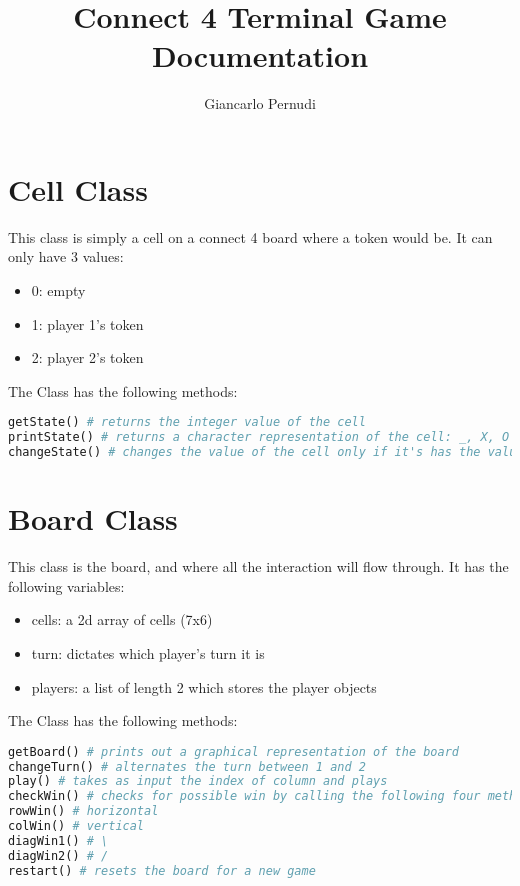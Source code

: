 \documentclass[12pt]{article}
\title{Connect 4 Terminal Game Documentation}
\author{Giancarlo Pernudi}
\begin{document}
\maketitle

\section{Cell Class}

This class is simply a cell on a connect 4 board where a token would be. It can only have 3 values:
\begin{itemize}
  \item 0: empty
  \item 1: player 1's token
  \item 2: player 2's token
\end{itemize}


The Class has the following methods:
\begin{lstlisting}[language=Python]
getState() # returns the integer value of the cell
printState() # returns a character representation of the cell: _, X, O
changeState() # changes the value of the cell only if it's has the value of 0 when called
\end{lstlisting}

\section{Board Class}

This class is the board, and where all the interaction will flow through. It has the following variables:
\begin{itemize}
  \item cells: a 2d array of cells (7x6)
  \item turn: dictates which player's turn it is
  \item players: a list of length 2 which stores the player objects
\end{itemize}


The Class has the following methods:
\begin{lstlisting}[language=Python]
getBoard() # prints out a graphical representation of the board
changeTurn() # alternates the turn between 1 and 2
play() # takes as input the index of column and plays
checkWin() # checks for possible win by calling the following four methods:
rowWin() # horizontal
colWin() # vertical
diagWin1() # \
diagWin2() # /
restart() # resets the board for a new game
\end{lstlisting}
\end{document}
